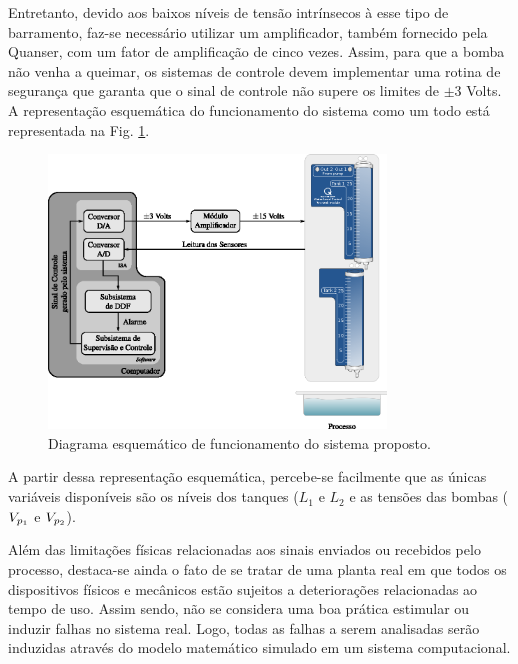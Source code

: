 
Entretanto, devido aos baixos níveis de tensão intrínsecos à esse tipo de
barramento, faz-se necessário utilizar um amplificador, também fornecido pela
Quanser\reg, com um fator de amplificação de cinco vezes. Assim, para que a
bomba não venha a queimar, os sistemas de controle devem implementar uma rotina
de segurança que garanta que o sinal de controle não supere os limites de $\pm
3$ Volts. A representação esquemática do funcionamento do sistema como um todo
está representada na Fig. \ref{fig:func_sistema}.

\begin{figure}[htb]
\centering
    \includegraphics[width=0.8\textwidth]{imgs/sistema/eps/func_sistema}
    \caption{Diagrama esquemático de funcionamento do sistema proposto.}
    \label{fig:func_sistema}
\end{figure}

A partir dessa representação esquemática, percebe-se facilmente que as únicas
variáveis disponíveis são os níveis dos tanques ($L_1$ e $L_2$ e as tensões das
bombas ($V_{p_{\tiny 1}}$ e $V_{p_{\tiny 2}}$).

Além das limitações físicas relacionadas aos sinais enviados ou recebidos pelo
processo, destaca-se ainda o fato de se tratar de uma planta real em que todos
os dispositivos físicos e mecânicos estão sujeitos a deteriorações relacionadas
ao tempo de uso. Assim sendo, não se considera uma boa prática estimular ou
induzir falhas no sistema real. Logo, todas as falhas a serem analisadas serão
induzidas através do modelo matemático simulado em um sistema computacional.

